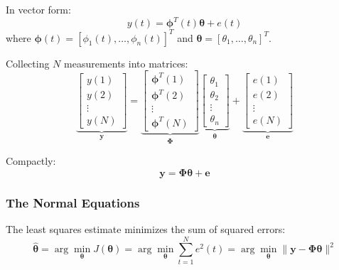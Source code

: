 In vector form:
\begin{equation}
y(t) = \boldsymbol{\phi}^T(t) \boldsymbol{\theta} + e(t)
\label{eq:regression_vector}
\end{equation}
where $\boldsymbol{\phi}(t) = [\phi_1(t), \ldots, \phi_n(t)]^T$ and $\boldsymbol{\theta} = [\theta_1, \ldots, \theta_n]^T$.

Collecting $N$ measurements into matrices:
\begin{equation}
\underbrace{\begin{bmatrix} y(1) \\ y(2) \\ \vdots \\ y(N) \end{bmatrix}}_{\mathbf{y}} = \underbrace{\begin{bmatrix} \boldsymbol{\phi}^T(1) \\ \boldsymbol{\phi}^T(2) \\ \vdots \\ \boldsymbol{\phi}^T(N) \end{bmatrix}}_{\boldsymbol{\Phi}} \underbrace{\begin{bmatrix} \theta_1 \\ \theta_2 \\ \vdots \\ \theta_n \end{bmatrix}}_{\boldsymbol{\theta}} + \underbrace{\begin{bmatrix} e(1) \\ e(2) \\ \vdots \\ e(N) \end{bmatrix}}_{\mathbf{e}}
\label{eq:matrix_form}
\end{equation}

Compactly:
\begin{equation}
\mathbf{y} = \boldsymbol{\Phi} \boldsymbol{\theta} + \mathbf{e}
\label{eq:regression_matrix}
\end{equation}

\subsubsection{The Normal Equations}

The least squares estimate minimizes the sum of squared errors:
\begin{equation}
\hat{\boldsymbol{\theta}} = \arg\min_{\boldsymbol{\theta}} J(\boldsymbol{\theta}) = \arg\min_{\boldsymbol{\theta}} \sum_{t=1}^{N} e^2(t) = \arg\min_{\boldsymbol{\theta}} \|\mathbf{y} - \boldsymbol{\Phi}\boldsymbol{\theta}\|^2
\label{eq:ls_criterion}
\end{equation}

